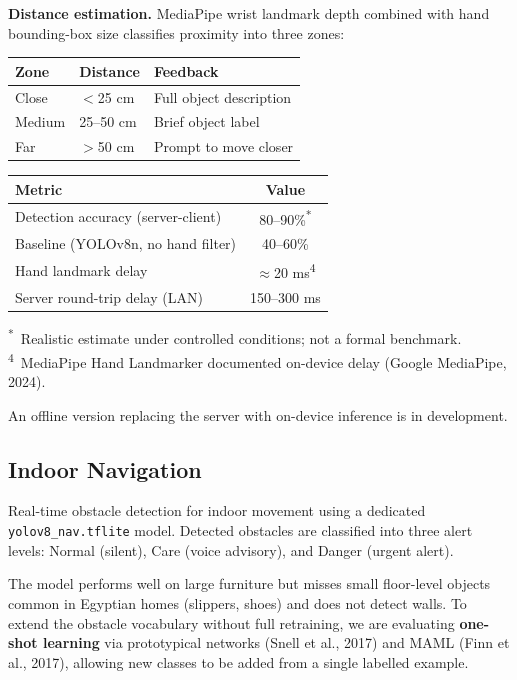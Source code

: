 \documentclass[12pt, a4paper]{article}
\begin{document}
\textbf{Distance estimation.}
MediaPipe wrist landmark depth combined with hand bounding-box size classifies proximity
into three zones:

\begin{center}
\begin{tabular}{lll}
\toprule
\textbf{Zone} & \textbf{Distance} & \textbf{Feedback} \\
\midrule
Close   & $<$25 cm  & Full object description \\
Medium  & 25--50 cm & Brief object label \\
Far     & $>$50 cm  & Prompt to move closer \\
\bottomrule
\end{tabular}
\end{center}

\begin{center}
\begin{tabular}{lc}
\toprule
\textbf{Metric} & \textbf{Value} \\
\midrule
Detection accuracy (server-client)      & 80--90\%\textsuperscript{*} \\
Baseline (YOLOv8n, no hand filter)      & 40--60\% \\
Hand landmark delay                     & $\approx$20 ms\textsuperscript{4} \\
Server round-trip delay (LAN)           & 150--300 ms \\
\bottomrule
\end{tabular}
\end{center}

{\small
\textsuperscript{*}~Realistic estimate under controlled conditions; not a formal benchmark.\\
\textsuperscript{4}~MediaPipe Hand Landmarker documented on-device delay (Google MediaPipe, 2024).
}

An offline version replacing the server with on-device inference is in development.

\subsection{Indoor Navigation}

Real-time obstacle detection for indoor movement using a dedicated
\texttt{yolov8\_nav.tflite} model. Detected obstacles are classified into three alert levels:
Normal (silent), Care (voice advisory), and Danger (urgent alert).

The model performs well on large furniture but misses small floor-level objects common in
Egyptian homes (slippers, shoes) and does not detect walls. To extend the obstacle vocabulary
without full retraining, we are evaluating \textbf{one-shot learning} via prototypical networks
(Snell et al., 2017) and MAML (Finn et al., 2017), allowing new classes to be added from a
single labelled example.
\end{document}
